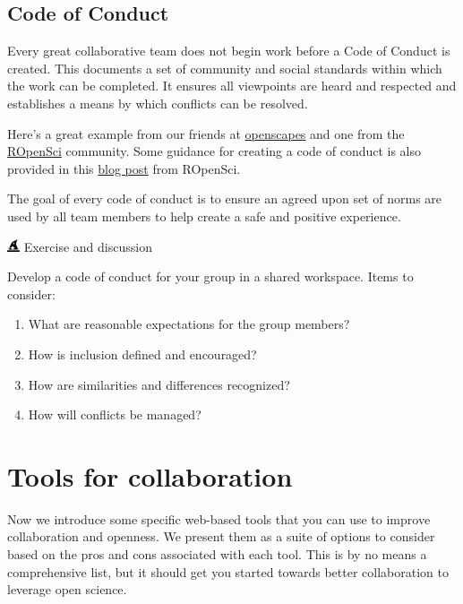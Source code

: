 \documentclass[
  letterpaper,
  DIV=11,
  numbers=noendperiod]{scrreprt}
\providecommand{\tightlist}{%
  \setlength{\itemsep}{0pt}\setlength{\parskip}{0pt}}\usepackage{longtable,booktabs,array}
\begin{document}
\hypertarget{code-of-conduct}{%
\subsection{Code of Conduct}\label{code-of-conduct}}

Every great collaborative team does not begin work before a Code of
Conduct is created. This documents a set of community and social
standards within which the work can be completed. It ensures all
viewpoints are heard and respected and establishes a means by which
conflicts can be resolved.

Here's a great example from our friends at
\href{https://www.openscapes.org/code-of-conduct/}{openscapes} and one
from the \href{https://ropensci.org/code-of-conduct/}{ROpenSci}
community. Some guidance for creating a code of conduct is also provided
in this
\href{https://ropensci.org/blog/2016/12/21/commcallv12-review-coc/}{blog
post} from ROpenSci.

The goal of every code of conduct is to ensure an agreed upon set of
norms are used by all team members to help create a safe and positive
experience.

\includegraphics[width=1em,height=1em]{./collaborate_files/figure-pdf/fa-icon-20d474448f872ee43905e611a2502347.pdf}
Exercise and discussion

Develop a code of conduct for your group in a shared workspace. Items to
consider:

\begin{enumerate}
\def\labelenumi{\arabic{enumi}.}
\tightlist
\item
  What are reasonable expectations for the group members?
\item
  How is inclusion defined and encouraged?
\item
  How are similarities and differences recognized?
\item
  How will conflicts be managed?
\end{enumerate}

\hypertarget{tools-for-collaboration}{%
\section{Tools for collaboration}\label{tools-for-collaboration}}

Now we introduce some specific web-based tools that you can use to
improve collaboration and openness. We present them as a suite of
options to consider based on the pros and cons associated with each
tool. This is by no means a comprehensive list, but it should get you
started towards better collaboration to leverage open science.
\end{document}
